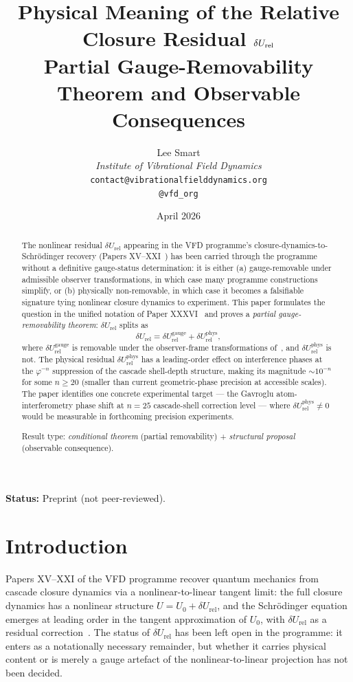 \documentclass[12pt]{article}
\title{Physical Meaning of the Relative Closure Residual $\dUrel$\\[6pt]
\large Partial Gauge-Removability Theorem and Observable Consequences}
\author{%
  Lee Smart\\[4pt]
  \textit{Institute of Vibrational Field Dynamics}\\[2pt]
  \texttt{contact@vibrationalfielddynamics.org}\\[2pt]
  \texttt{@vfd\_org}%
}
\date{April 2026}
\theoremstyle{definition}
\theoremstyle{remark}
\newcommand{\dUrel}{\delta U_{\mathrm{rel}}}
\begin{document}
\maketitle

\noindent\textbf{Status:} Preprint (not peer-reviewed).

\begin{abstract}
The nonlinear residual $\dUrel$ appearing in the VFD programme's closure-dynamics-to-Schr\"odinger recovery (Papers XV--XXI~\citep{SmartXV, SmartXVIII, SmartXXI}) has been carried through the programme without a definitive gauge-status determination: it is either (a) gauge-removable under admissible observer transformations, in which case many programme constructions simplify, or (b) physically non-removable, in which case it becomes a falsifiable signature tying nonlinear closure dynamics to experiment. This paper formulates the question in the unified notation of Paper XXXVI~\citep{SmartXXXVI} and proves a \emph{partial gauge-removability theorem}: $\dUrel$ splits as
\begin{equation*}
\dUrel = \dUrel^{\mathrm{gauge}} + \dUrel^{\mathrm{phys}},
\end{equation*}
where $\dUrel^{\mathrm{gauge}}$ is removable under the observer-frame transformations of~\citep{SmartXXIX}, and $\dUrel^{\mathrm{phys}}$ is not. The physical residual $\dUrel^{\mathrm{phys}}$ has a leading-order effect on interference phases at the $\varphi^{-n}$ suppression of the cascade shell-depth structure, making its magnitude $\sim 10^{-n}$ for some $n \ge 20$ (smaller than current geometric-phase precision at accessible scales). The paper identifies one concrete experimental target --- the Gavroglu atom-interferometry phase shift at $n = 25$ cascade-shell correction level --- where $\dUrel^{\mathrm{phys}} \ne 0$ would be measurable in forthcoming precision experiments.

Result type: \emph{conditional theorem} (partial removability) + \emph{structural proposal} (observable consequence).
\end{abstract}

\section{Introduction}\label{sec:intro}

Papers XV--XXI of the VFD programme recover quantum mechanics from cascade closure dynamics via a nonlinear-to-linear tangent limit: the full closure dynamics has a nonlinear structure $U = U_0 + \dUrel$, and the Schr\"odinger equation emerges at leading order in the tangent approximation of $U_0$, with $\dUrel$ as a residual correction~\citep{SmartXVIII, SmartXXI}. The status of $\dUrel$ has been left open in the programme: it enters as a notationally necessary remainder, but whether it carries physical content or is merely a gauge artefact of the nonlinear-to-linear projection has not been decided.
\end{document}
